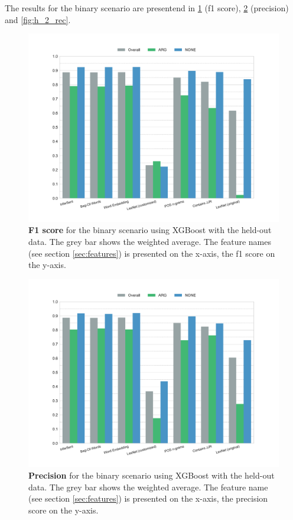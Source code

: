 \FloatBarrier

The results for the binary scenario are presentend in \ref{fig:h_2_f1} (f1 score), \ref{fig:h_2_prec} (precision) and \ref{fig:h_2_rec}.

\begin{figure}[htbp]
         \caption{\textbf{F1 score} for the binary scenario using XGBoost with the held-out data. The grey bar shows the weighted average. The feature names (see section \ref{sec:features}) is presented on the x-axis, the f1 score on the y-axis.} 
    \label{fig:h_2_f1}
    \centering
	\includegraphics[width=0.9\linewidth]{images/heldout/h-f1-True}
    \end{figure}


\begin{figure}[htbp]
         \caption{\textbf{Precision} for the binary scenario using XGBoost with the held-out data. The grey bar shows the weighted average. The feature name (see section \ref{sec:features}) is presented on the x-axis, the precision score on the y-axis.} 
    \label{fig:h_2_prec}
    \centering
	\includegraphics[width=0.9\linewidth]{images/heldout/h-precision-True}
    \end{figure}
    
